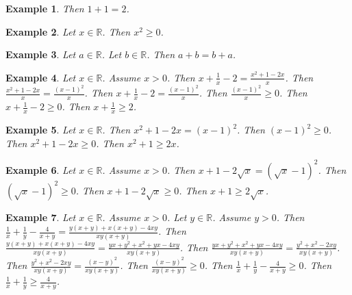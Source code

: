 \documentclass[12pt]{article}
\newtheorem{example}{Example}
\begin{document}

\begin{example}
    Then $1+1=2$.
\end{example}

\begin{example}
    Let $x\in\mathbb{R}$. Then $x^2\ge 0$.
\end{example}

\begin{example}
    Let $a\in\mathbb{R}$. Let $b\in\mathbb{R}$. Then $a+b=b+a$.
\end{example}

\begin{example}
    Let $x\in\mathbb{R}$. Assume $x>0$. Then $x + \frac{1}{x} - 2 = \frac{x^2 + 1 - 2x}{x}$.
    Then $\frac{x^2 + 1 - 2x}{x} = \frac{{(x-1)}^2}{x}$.
    Then $x + \frac{1}{x} - 2 = \frac{{(x-1)}^2}{x}$.
    Then $\frac{{(x-1)}^2}{x} \ge 0$.
    Then $x + \frac{1}{x} - 2 \ge 0$.
    Then $x + \frac{1}{x} \ge 2$.
\end{example}



\begin{example}
    Let $x\in\mathbb{R}$. Then $x^2 + 1 - 2x = {(x-1)}^2$. Then ${(x-1)}^2 \ge 0$. Then $x^2 + 1 - 2x \ge 0$. Then $x^2 + 1 \ge 2x$.
\end{example}

\begin{example}
    Let $x\in\mathbb{R}$. Assume $x > 0$. Then $x + 1 - 2\sqrt{x} = {(\sqrt{x}-1)}^2$. Then ${(\sqrt{x}-1)}^2 \ge 0$. Then $x + 1 - 2\sqrt{x} \ge 0$. Then $x + 1 \ge 2\sqrt{x}$.
\end{example}

\begin{example}
    Let $x\in\mathbb{R}$. Assume $x>0$.
    Let $y\in\mathbb{R}$. Assume $y>0$.
    Then $\frac{1}{x} + \frac{1}{y} - \frac{4}{x+y} = \frac{y(x+y) + x(x+y) - 4xy}{xy(x+y)}$.
    Then $\frac{y(x+y) + x(x+y) - 4xy}{xy(x+y)} = \frac{yx + y^2 + x^2 + yx - 4xy}{xy(x+y)}$.
    Then $\frac{yx + y^2 + x^2 + yx - 4xy}{xy(x+y)} = \frac{y^2 + x^2 -2xy}{xy(x+y)}$. %
    Then $\frac{y^2 + x^2 -2xy}{xy(x+y)} = \frac{{(x-y)}^2}{xy(x+y)}$.
    Then $\frac{{(x-y)}^2}{xy(x+y)} \ge 0$.
    Then $\frac{1}{x} + \frac{1}{y} - \frac{4}{x+y} \ge 0$.
    Then $\frac{1}{x} + \frac{1}{y} \ge \frac{4}{x+y}$.
\end{example}
\end{document}
